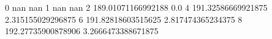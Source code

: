 0 nan nan
1 nan nan
2 189.01071166992188 0.0
4 191.32586669921875 2.315155029296875
6 191.82818603515625 2.817474365234375
8 192.27735900878906 3.2666473388671875
